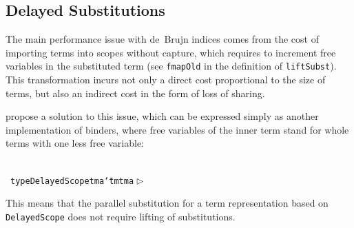 \documentclass[9pt,authoryear]{sigplanconf}
\begin{document}
%
%


\subsection{Delayed Substitutions}

%
The main performance issue with de{~}Brujn indices comes from the cost
    of importing terms into scopes without capture, which requires to
    increment free variables in the substituted term (see \texttt{fmap}\texttt{\mbox{\hspace{0.50em}}}\texttt{Old}    in the definition of \texttt{liftSubst}). This transformation incurs not
    only a direct cost proportional to the size of terms, but also an
    indirect cost in the form of loss of sharing.%


%
 propose a solution to this issue, which can
    be expressed simply as another implementation of binders, where free
    variables of the inner term stand for whole terms with one less free
    variable{:}%


{\nopagebreak }

%
%
%
~\\~\vphantom{$\{$}\texttt{type}\texttt{\mbox{\hspace{0.50em}}}\texttt{DelayedScope}\texttt{\mbox{\hspace{0.50em}}}\texttt{tm}\texttt{\mbox{\hspace{0.50em}}}\texttt{a}\texttt{\mbox{\hspace{0.50em}}}\texttt{{\char `\=}}\texttt{\mbox{\hspace{0.50em}}}\texttt{tm}\texttt{\mbox{\hspace{0.50em}}}\texttt{\makebox[1.22ex][l]{$ {(} $}}\texttt{tm}\texttt{\mbox{\hspace{0.50em}}}\texttt{a}\texttt{\mbox{\hspace{0.50em}}}\texttt{$ \vartriangleright $}\texttt{\mbox{\hspace{0.50em}}}\texttt{\makebox[1.22ex][l]{$ {(} $}}\texttt{\makebox[1.22ex][r]{$ {)} $}}\texttt{\makebox[1.22ex][r]{$ {)} $}}\texttt{{\nopagebreak \newline%
}\vphantom{$\{$}}%


%
This means that the parallel substitution for a term representation 
    based on \texttt{DelayedScope} does not require lifting of substitutions.%


{\nopagebreak }
\end{document}
